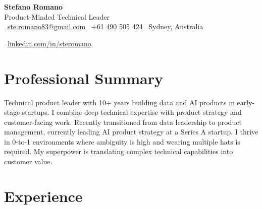 \documentclass[10pt,a4paper]{article}
\begin{document}
\begin{center}
    {\Huge\bfseries\color{darkgray} Stefano Romano} \\[5pt]
    {\large\color{accentcolor} Product-Minded Technical Leader} \\[8pt]
    {\small
    \faEnvelope\ \href{mailto:ste.romano83@gmail.com}{ste.romano83@gmail.com} \quad
    \faPhone\ +61 490 505 424 \quad
    \faMapMarker\ Sydney, Australia}
\end{center}
\vspace{3pt}

\begin{center}
    {\small
    \faLinkedin\ \href{https://linkedin.com/in/steromano}{linkedin.com/in/steromano}}
\end{center}
\vspace{3pt}

\section*{Professional Summary}
Technical product leader with 10+ years building data and AI products in early-stage startups. I combine deep technical expertise with product strategy and customer-facing work. Recently transitioned from data leadership to product management, currently leading AI product strategy at a Series A startup. I thrive in 0-to-1 environments where ambiguity is high and wearing multiple hats is required. My superpower is translating complex technical capabilities into customer value.

\section*{Experience}
\end{document}
